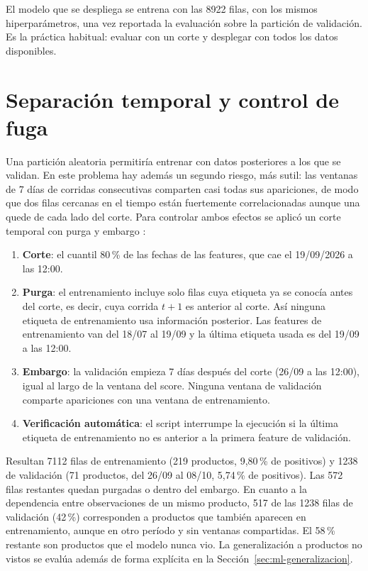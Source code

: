 El modelo que se despliega se entrena con las 8922 filas, con los mismos hiperparámetros, una vez reportada la evaluación sobre la partición de validación. Es la práctica habitual: evaluar con un corte y desplegar con todos los datos disponibles.

\section{Separación temporal y control de fuga}\label{sec:control-fuga}

Una partición aleatoria permitiría entrenar con datos posteriores a los que se validan. En este problema hay además un segundo riesgo, más sutil: las ventanas de 7 días de corridas consecutivas comparten casi todas sus apariciones, de modo que dos filas cercanas en el tiempo están fuertemente correlacionadas aunque una quede de cada lado del corte. Para controlar ambos efectos se aplicó un corte temporal con purga y embargo \parencite{LopezDePrado2018,BergmeirBenitez2012}:

\begin{enumerate}
	\item \textbf{Corte}: el cuantil 80\,\% de las fechas de las features, que cae el 19/09/2026 a las 12:00.
	\item \textbf{Purga}: el entrenamiento incluye solo filas cuya etiqueta ya se conocía antes del corte, es decir, cuya corrida $t+1$ es anterior al corte. Así ninguna etiqueta de entrenamiento usa información posterior. Las features de entrenamiento van del 18/07 al 19/09 y la última etiqueta usada es del 19/09 a las 12:00.
	\item \textbf{Embargo}: la validación empieza 7 días después del corte (26/09 a las 12:00), igual al largo de la ventana del score. Ninguna ventana de validación comparte apariciones con una ventana de entrenamiento.
	\item \textbf{Verificación automática}: el script interrumpe la ejecución si la última etiqueta de entrenamiento no es anterior a la primera feature de validación.
\end{enumerate}

Resultan 7112 filas de entrenamiento (219 productos, 9,80\,\% de positivos) y 1238 de validación (71 productos, del 26/09 al 08/10, 5,74\,\% de positivos). Las 572 filas restantes quedan purgadas o dentro del embargo. En cuanto a la dependencia entre observaciones de un mismo producto, 517 de las 1238 filas de validación (42\,\%) corresponden a productos que también aparecen en entrenamiento, aunque en otro período y sin ventanas compartidas. El 58\,\% restante son productos que el modelo nunca vio. La generalización a productos no vistos se evalúa además de forma explícita en la Sección~\ref{sec:ml-generalizacion}.

